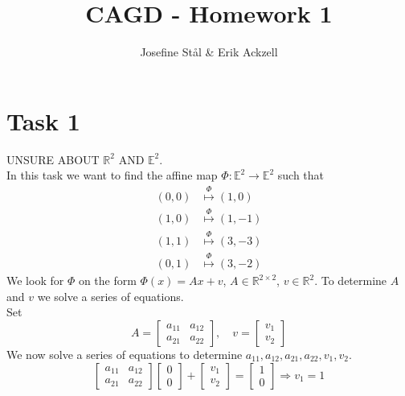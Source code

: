 \documentclass[]{article}
\title{CAGD - Homework 1}
\author{Josefine Stål \& Erik Ackzell}
\begin{document}
\maketitle
\section*{Task 1}
UNSURE ABOUT $\mathbb{R}^2$ AND $\mathbb{E}^2$.\\
In this task we want to find the affine map $\Phi:\mathbb{E}^2 \rightarrow \mathbb{E}^2$ such that \begin{equation*}
\begin{aligned}
(0,0)&\overset{\Phi}{\mapsto}(1,0)\\
(1,0)&\overset{\Phi}{\mapsto}(1,-1)\\
(1,1)&\overset{\Phi}{\mapsto}(3,-3)\\
(0,1)&\overset{\Phi}{\mapsto}(3,-2)
\end{aligned}
\end{equation*}
We look for $\Phi$ on the form $\Phi(x) = Ax + v$, $A\in \mathbb{R}^{2\times 2}$, $v\in \mathbb{R}^2$. To determine $A$ and $v$ we solve a series of equations.\\
Set \begin{equation*}
A=\left[\begin{array}{cc}
a_{11}&a_{12}\\
a_{21}&a_{22}
\end{array}\right], \quad v=\left[\begin{array}{c}
v_1\\
v_2
\end{array}\right]
\end{equation*}
We now solve a series of equations to determine $a_{11}, a_{12}, a_{21}, a_{22}, v_1, v_2$.
\begin{equation}
\left[\begin{array}{cc}
a_{11}&a_{12}\\
a_{21}&a_{22}
\end{array}\right]\left[\begin{array}{c}
0\\
0
\end{array}\right] + \left[\begin{array}{c}
v_1\\
v_2
\end{array}\right] = \left[\begin{array}{c}
1\\
0
\end{array}\right]\Rightarrow v_1=1\label{first}
\end{equation}
\end{document}
